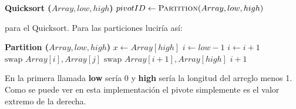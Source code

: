 \documentclass[conference]{IEEEtran}
\begin{document}
\begin{algorithm}[H]
    \begin{algorithmic}
    \State\textbf{Quicksort ($Array, low, high$)} 
        \State$pivotID \gets \Call{Partition}{Array, low, high}$
        \State{}
        \State{}
    \EndIf{}
    \end{algorithmic}
\end{algorithm}

para el Quicksort. Para las particiones luciría así: 

\begin{algorithm}[H]
    \begin{algorithmic}
    \State\textbf{Partition ($Array, low, high$)}
        \State$x \gets Array[high]$ 
        \State$i \gets low - 1$
                \State$i \gets i + 1$
                \State$\text{swap } Array[i] , Array[j]$
            \EndIf{}
        \EndFor{}
        \State$\text{swap } Array[i + 1] , Array[high]$
        \State\Return$i + 1$
        \end{algorithmic}
\end{algorithm}

En la primera llamada \textbf{low} sería $0$ y \textbf{high} sería la longitud del arreglo menos 1.
Como se puede ver en esta implementación el pivote simplemente es el valor extremo de la derecha.
\end{document}
